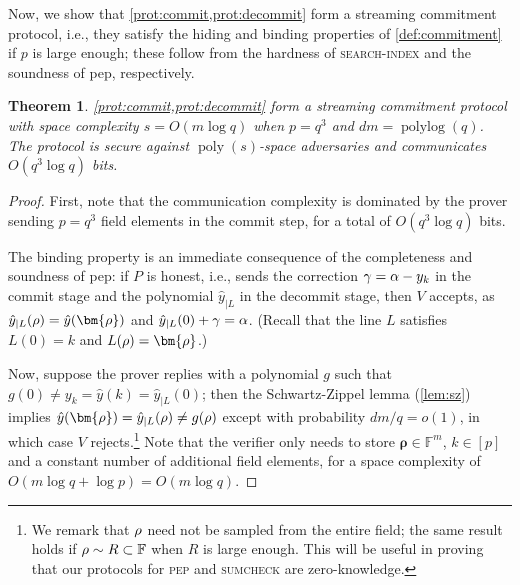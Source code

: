 \documentclass[a4paper,UKenglish,cleveref, autoref, thm-restate]{lipics-v2021}
\newtheorem{theorem}{Theorem}[section]
\theoremstyle{definition}
\newcommand{\field}{\mathbb{F}}
\newcommand{\poly}{\operatorname{poly}}
\newcommand{\polylog}{\operatorname{polylog}}
\newcommand{\searchindex}{\normalfont\textsc{search-index}\xspace}
\newcommand{\pep}{\normalfont\textsc{pep}\xspace}
\newcommand{\pepprotocol}{\textsf{pep}\xspace}
\newcommand{\sumcheck}{\normalfont\textsc{sumcheck}\xspace}
\newcommand{\pcommitlength}{p}
\newcommand{\pcommitstring}{y}
\newcommand{\dimension}{m}
\newcommand{\degree}{d}
\newcommand{\fieldsize}{q}
\newcommand{\fingerprinttuple}{\bm{\rho}}
\renewcommand{\line}{L}
\def\fe#1{
    \ifnum#1=1
        \alpha
    \else
    \ifnum#1=2
        \beta
    \else
    \ifnum#1=3
        \gamma
    \fi\fi\fi
}
\def\rfe#1{
    \ifnum#1=1
        \rho
    \else
    \ifnum#1=2
        \sigma
    \else
    \fi\fi
}
\begin{document}
Now, we show that \cref{prot:commit,prot:decommit} form a streaming commitment protocol, i.e., they satisfy the hiding and binding properties of \cref{def:commitment} if $\pcommitlength$ is large enough; these follow from the hardness of \searchindex and the soundness of \pepprotocol, respectively.
\begin{theorem}
    \label{thm:pv-commitment}
    \cref{prot:commit,prot:decommit} form a streaming commitment protocol with space complexity $s = O(\dimension \log \fieldsize)$ when $\pcommitlength = \fieldsize^3$ and $\degree \dimension = \polylog(\fieldsize)$. The protocol is secure against $\poly(s)$-space adversaries and communicates $O(\fieldsize^3 \log \fieldsize)$ bits.
\end{theorem}

\begin{proof}
    First, note that the communication complexity is dominated by the prover sending $\pcommitlength = \fieldsize^3$ field elements in the \textsf{commit} step, for a total of $O(\fieldsize^3 \log \fieldsize)$ bits.

    The binding property is an immediate consequence of the completeness and soundness of \pepprotocol: if $P$ is honest, i.e., sends the correction $\fe3 = \fe1 - \pcommitstring_k$ in the \textsf{commit} stage and the polynomial $\hat y_{|\line}$ in the \textsf{decommit} stage, then $V$ accepts, as $\hat \pcommitstring_{|\line}(\rfe1) = \hat \pcommitstring(\fingerprinttuple)$ and $\hat \pcommitstring_{|\line}(0) + \fe3 = \fe1$. (Recall that the line $\line$ satisfies $\line(0) = k$ and $\line(\rfe1) = \fingerprinttuple$.)
    
    Now, suppose the prover replies with a polynomial $g$ such that $g(0) \neq \pcommitstring_k = \hat \pcommitstring(k) = \hat \pcommitstring_{|\line}(0)$; then the Schwartz-Zippel lemma (\cref{lem:sz}) implies $\hat \pcommitstring(\fingerprinttuple) = \hat \pcommitstring_{|\line}(\rfe1) \neq g(\rfe1)$ except with probability $\degree \dimension / \fieldsize = o(1)$, in which case $V$ rejects.\footnote{We remark that $\rfe1$ need not be sampled from the entire field; the same result holds if $\rfe1 \sim R \subset \field$ when $R$ is large enough. This will be useful in proving that our protocols for \pep and \sumcheck are zero-knowledge.} Note that the verifier only needs to store $\fingerprinttuple \in \field^\dimension$, $k \in [\pcommitlength]$ and a constant number of additional field elements, for a space complexity of $O(\dimension \log \fieldsize + \log \pcommitlength) = O(\dimension \log \fieldsize)$.


\end{proof}
\end{document}
